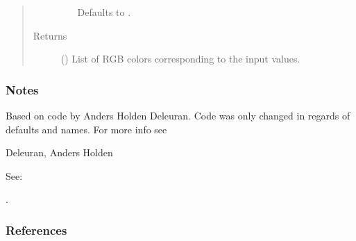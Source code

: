 \documentclass[letterpaper,10pt,english]{sphinxmanual}
\begin{document}
\begin{fulllineitems}
\begin{quote}
\begin{description}
\begin{itemize}
Defaults to  .


\end{itemize}

\item[{Returns}] \leavevmode
{} () \textendash{} List of RGB colors corresponding to the input values.

\end{description}\end{quote}
\subsubsection*{Notes}

Based on code by Anders Holden Deleuran. Code was only changed in regards
of defaults and names.
For more info see  %
\begin{footnote}[10]\sphinxAtStartFootnote
Deleuran, Anders Holden 

See: 
%
\end{footnote} .
\subsubsection*{References}

\end{fulllineitems}

\end{document}
